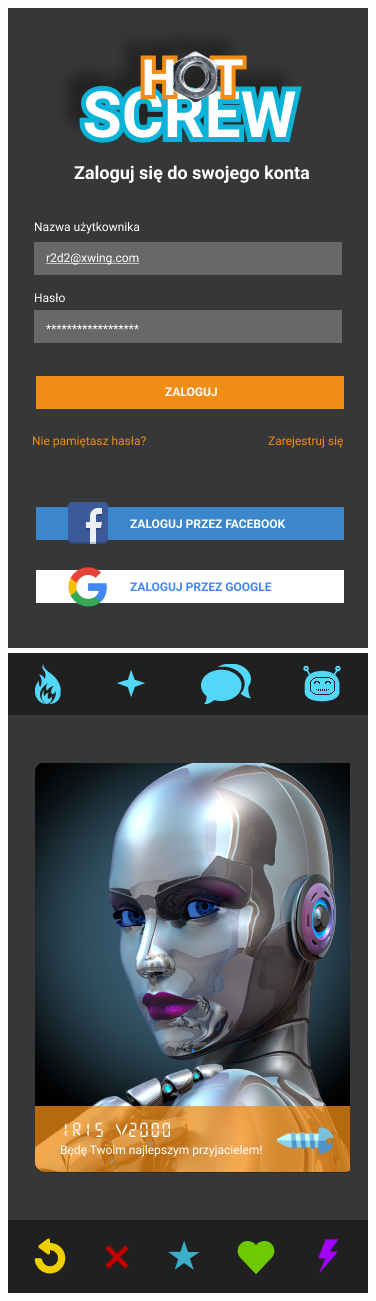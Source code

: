 \documentclass[12pt,a4paper]{article}
\begin{document}
\begin{center}
		\includegraphics[width=0.6\linewidth]{img/Login.png}
		\includegraphics[width=0.6\linewidth]{img/Android1.png}

\end{center}
\end{document}
